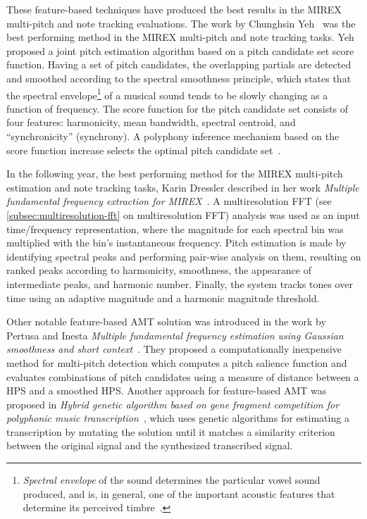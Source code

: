 These feature-based techniques have produced the best results in the \ac{MIREX}~\cite{mirex} multi-pitch and note
tracking evaluations. The work by Chunghsin Yeh~\cite{fundamental-frequency-estimation} was the best performing method in
the \ac{MIREX} multi-pitch and note tracking tasks. Yeh proposed a joint pitch estimation algorithm based on a pitch
candidate set score function. Having a set of pitch candidates, the overlapping partials are detected and smoothed
according to the spectral smoothness principle, which states that the spectral envelope\footnote{\textit{Spectral
envelope} of the sound determines the particular vowel sound produced, and is, in general, one of the important acoustic
features that determine its perceived timbre~\cite{kumar2007hierarchical}.} of a musical sound tends to be slowly
changing as a function of frequency. The score function for the pitch candidate set consists of four features:
harmonicity, mean bandwidth, spectral centroid, and ``synchronicity'' (synchrony). A polyphony inference mechanism based
on the score function increase selects the optimal pitch candidate set~\cite{fundamental-frequency-estimation}.

In the following year, the best performing method for the \ac{MIREX} multi-pitch estimation and note tracking tasks,
Karin Dressler described in her work \textit{Multiple fundamental frequency extraction for MIREX}~\cite{dressler2012multiple}.
A multiresolution \ac{FFT} (see \cref{subsec:multiresolution-fft} on multiresolution \ac{FFT}) analysis was used as
an input time/frequency representation, where the magnitude for each spectral bin was multiplied with the bin’s
instantaneous frequency. Pitch estimation is made by identifying spectral peaks and performing pair-wise analysis on
them, resulting on ranked peaks according to harmonicity, smoothness, the appearance of intermediate peaks, and harmonic
number. Finally, the system tracks tones over time using an adaptive magnitude and a harmonic magnitude threshold.

Other notable feature-based \ac{AMT} solution was introduced in the work by Pertusa and Inesta \textit{Multiple
fundamental frequency estimation using Gaussian smoothness and short context}~\cite{pertusa2008multiple}. They proposed
a computationally inexpensive method for multi-pitch detection which computes a pitch salience function and evaluates
combinations of pitch candidates using a measure of distance between a \ac{HPS} and a smoothed \ac{HPS}. Another
approach for feature-based \ac{AMT} was proposed in \textit{Hybrid genetic algorithm based on gene fragment competition
for polyphonic music transcription}~\cite{reis2008hybrid}, which uses genetic algorithms for estimating a transcription
by mutating the solution until it matches a similarity criterion between the original signal and the synthesized
transcribed signal.

